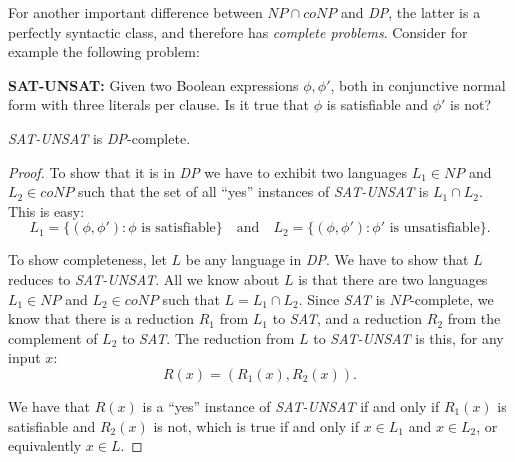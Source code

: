 For another important difference between $NP \cap coNP$ and \textit{DP}, the latter is a perfectly syntactic class, and therefore has \textit{complete problems}. Consider for example the following problem:

\textbf{SAT-UNSAT:} Given two Boolean expressions $\phi, \phi'$, both in conjunctive normal form with three literals per clause. Is it true that $\phi$ is satisfiable and $\phi'$ is not?
\begin{defbox}[Theorem]
    \textit{SAT-UNSAT} is \textit{DP}-complete.
\end{defbox}
\begin{proof}
    To show that it is in \textit{DP} we have to exhibit two languages $L_1 \in NP$ and $L_2 \in coNP$ such that the set of all ``yes'' instances of \textit{SAT-UNSAT} is $L_1 \cap L_2$. This is easy: 
\[
L_1 = \{(\phi, \phi') : \phi \text{ is satisfiable}\} \quad \text{and} \quad L_2 = \{(\phi, \phi') : \phi' \text{ is unsatisfiable}\}.
\]

To show completeness, let $L$ be any language in \textit{DP}. We have to show that $L$ reduces to \textit{SAT-UNSAT}. All we know about $L$ is that there are two languages $L_1 \in NP$ and $L_2 \in coNP$ such that $L = L_1 \cap L_2$. Since \textit{SAT} is $NP$-complete, we know that there is a reduction $R_1$ from $L_1$ to \textit{SAT}, and a reduction $R_2$ from the complement of $L_2$ to \textit{SAT}. The reduction from $L$ to \textit{SAT-UNSAT} is this, for any input $x$:
\[
R(x) = (R_1(x), R_2(x)).
\]

We have that $R(x)$ is a ``yes'' instance of \textit{SAT-UNSAT} if and only if $R_1(x)$ is satisfiable and $R_2(x)$ is not, which is true if and only if $x \in L_1$ and $x \in L_2$, or equivalently $x \in L$.
\end{proof}

